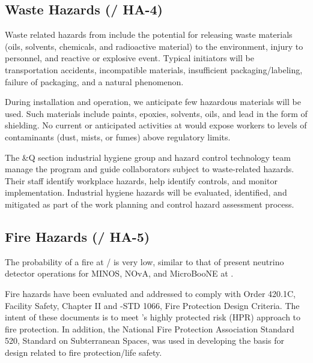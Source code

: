 \subsection{Waste Hazards (/ HA-4)}

Waste related hazards from  include the potential for releasing
waste materials (oils, solvents, chemicals, and radioactive material)
to the environment, injury to personnel, and reactive or
explosive event. Typical initiators will be transportation accidents,
incompatible materials, insufficient packaging/labeling, failure of
packaging, and a natural phenomenon.

During installation and  operation, we anticipate 
few hazardous materials will be used. Such materials
include paints, epoxies, solvents, oils, and lead in the form of
shielding. No current or anticipated activities at  
would expose workers to levels of contaminants (dust, mists, or fumes)
above regulatory limits.

The \&Q section industrial hygiene group and hazard control
technology team manage the program and guide 
collaborators subject to
waste-related hazards.  Their staff identify workplace
hazards, help identify controls, and monitor
implementation. Industrial hygiene hazards will be evaluated,
identified, and mitigated as part of the work planning and control
hazard assessment process.

\subsection{Fire Hazards (/ HA-5)}

The probability of a fire at / is very low,
similar to that of present neutrino detector operations for MINOS,
NOvA, and MicroBooNE at \fnal.


Fire hazards have been evaluated and addressed to comply with 
Order 420.1C, Facility Safety, Chapter II and -STD 1066, Fire
Protection Design Criteria.  The intent of these documents is to meet
's highly protected risk (HPR) approach to fire protection.  In
addition, the National Fire Protection Association Standard
520, Standard on Subterranean Spaces, was used in developing the
basis for design related to fire protection/life safety.

